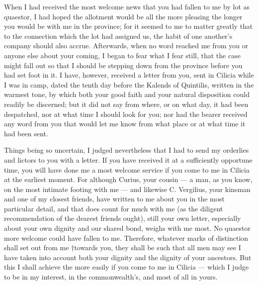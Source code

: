 

 When I had received the most welcome news that you had fallen to me by lot as quaestor, I had hoped the allotment would be all the more pleasing the longer you would be with me in the province; for it seemed to me to matter greatly that to the connection which the lot had assigned us, the habit of one another's company should also accrue. Afterwards, when no word reached me from you or anyone else about your coming, I began to fear what I fear still, that the case might fall out so that I should be stepping down from the province before you had set foot in it. I have, however, received a letter from you, sent in Cilicia while I was in camp, dated the tenth day before the Kalends of Quintilis, written in the warmest tone, by which both your good faith and your natural disposition could readily be discerned; but it did not say from where, or on what day, it had been despatched, nor at what time I should look for you; nor had the bearer received any word from you that would let me know from what place or at what time it had been sent.

 Things being so uncertain, I judged nevertheless that I had to send my orderlies and lictors to you with a letter. If you have received it at a sufficiently opportune time, you will have done me a most welcome service if you come to me in Cilicia at the earliest moment. For although Curius, your cousin --- a man, as you know, on the most intimate footing with me --- and likewise C. Vergilius, your kinsman and one of my closest friends, have written to me about you in the most particular detail, and that does count for much with me (as the diligent recommendation of the dearest friends ought), still your own letter, especially about your own dignity and our shared bond, weighs with me most. No quaestor more welcome could have fallen to me. Therefore, whatever marks of distinction shall set out from me †towards you, they shall be such that all men may see I have taken into account both your dignity and the dignity of your ancestors. But this I shall achieve the more easily if you come to me in Cilicia --- which I judge to be in my interest, in the commonwealth's, and most of all in yours.
